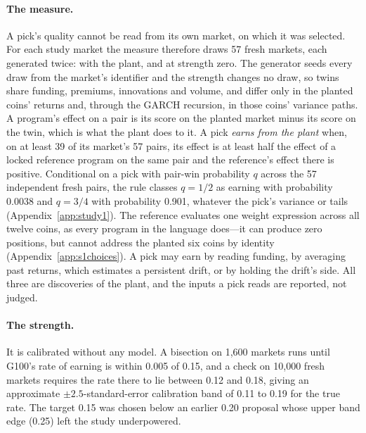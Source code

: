 \documentclass[11pt]{article}
\begin{document}
\paragraph{The measure.} A pick's quality cannot be read from its own market, on which it was selected. For each study market the measure therefore draws 57 fresh markets, each generated twice: with the plant, and at strength zero. The generator seeds every draw from the market's identifier and the strength changes no draw, so twins share funding, premiums, innovations and volume, and differ only in the planted coins' returns and, through the GARCH recursion, in those coins' variance paths. A program's effect on a pair is its score on the planted market minus its score on the twin, which is what the plant does to it. A pick \emph{earns from the plant} when, on at least 39 of its market's 57 pairs, its effect is at least half the effect of a locked reference program on the same pair and the reference's effect there is positive. Conditional on a pick with pair-win probability $q$ across the 57 independent fresh pairs, the rule classes $q=1/2$ as earning with probability 0.0038 and $q=3/4$ with probability 0.901, whatever the pick's variance or tails (Appendix~\ref{app:study1}). The reference evaluates one weight expression across all twelve coins, as every program in the language does---it can produce zero positions, but cannot address the planted six coins by identity (Appendix~\ref{app:s1choices}). A pick may earn by reading funding, by averaging past returns, which estimates a persistent drift, or by holding the drift's side. All three are discoveries of the plant, and the inputs a pick reads are reported, not judged.

\paragraph{The strength.} It is calibrated without any model. A bisection on 1{,}600 markets runs until G100's rate of earning is within 0.005 of 0.15, and a check on 10{,}000 fresh markets requires the rate there to lie between 0.12 and 0.18, giving an approximate $\pm 2.5$-standard-error calibration band of 0.11 to 0.19 for the true rate. The target 0.15 was chosen below an earlier 0.20 proposal whose upper band edge (0.25) left the study underpowered.
\end{document}
